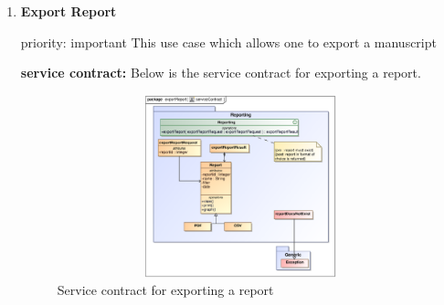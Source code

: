 \begin{enumerate}
 
\item \textbf{Export Report}
\par{priority: important  This use case which allows one to export a manuscript}
\par{\textbf{service contract:} Below is the service contract for exporting a report.}

\begin{figure}[h]
\includegraphics[height=200px, width=500px]{epsImages/Reporting/exportReport.eps}
\caption{Service contract for exporting a report}
\end{figure}
\end{enumerate}


